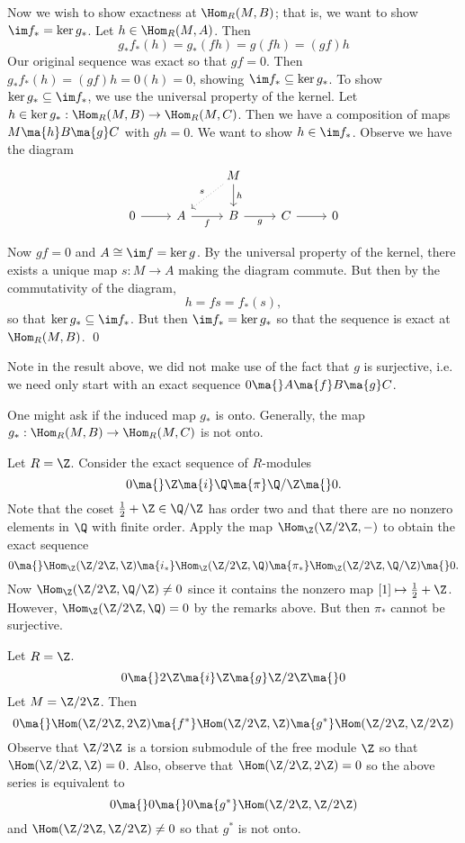 Now we wish to show exactness at $\Hom_R(M,B)$; that is, we want to show $\im f_*=\ker g_*$. Let $h \in \Hom_R(M,A)$. Then
	\[
	g_* f_*(h)=g_*(fh)=g (fh)=(gf) h
	\]
Our original sequence was exact so that $gf=0$. Then $g_*f_*(h)=(gf)h=0(h)=0$, showing $\im f_* \subseteq \ker g_*$. To show $\ker g_* \subseteq \im f_*$, we use the universal property of the kernel. Let $h \in \ker g_*: \Hom_R(M,B) \to \Hom_R(M,C)$. Then we have a composition of maps $M \ma{h} B \ma{g} C$ with $gh=0$. We want to show $h \in \im f_*$. Observe we have the diagram
	\[	
	\begin{tikzcd}
	\; & \;& M \arrow[swap,dotted]{dl}{s} \arrow{d}{h} & \; & \; \\
	0 \arrow{r} & A \arrow[swap]{r}{f} & B \arrow[swap]{r}{g} & C \arrow{r} & 0
	\end{tikzcd}
	\]

Now $gf=0$ and $A \cong \im f= \ker g$. By the universal property of the kernel, there exists a unique map $s: M \to A$ making the diagram commute. But then by the commutativity of the diagram,
	\[
	h=fs=f_*(s),
	\]
so that $\ker g_* \subseteq \im f_*$. But then $\im f_*=\ker g_*$ so that the sequence is exact at $\Hom_R(M,B)$. \qed \\


\begin{rem}
Note in the result above, we did not make use of the fact that $g$ is surjective, i.e. we need only start with an exact sequence $0 \ma{} A \ma{f} B \ma{g} C$.
\end{rem}


One might ask if the induced map $g_*$ is onto. Generally, the map $g_*: \Hom_R(M,B) \to \Hom_R(M,C)$ is not onto. 


\begin{ex}
Let $R=\Z$. Consider the exact sequence of $R$-modules
	\[
	0 \ma{} \Z \ma{i} \Q \ma{\pi} \Q/\Z \ma{} 0.
	\]
Note that the coset $\frac{1}{2}+\Z \in \Q/\Z$ has order two and that there are no nonzero elements in $\Q$ with finite order. Apply the map $\Hom_\Z(\Z/2\Z,-)$ to obtain the exact sequence
	\[
	0 \ma{} \Hom_\Z(\Z/2\Z,\Z) \ma{i_*} \Hom_\Z(\Z/2\Z,\Q) \ma{\pi_*} \Hom_\Z(\Z/2\Z,\Q/\Z) \ma{} 0.
	\]
Now $\Hom_\Z(\Z/2\Z,\Q/\Z) \neq 0$ since it contains the nonzero map $[1] \mapsto \frac{1}{2}+\Z$. However, $\Hom_\Z(\Z/2\Z,\Q)=0$ by the remarks above. But then $\pi_*$ cannot be surjective. \xqed
\end{ex}


\begin{ex}
Let $R=\Z$.
	\[
	0 \ma{} 2\Z \ma{i} \Z \ma{g} \Z/2\Z \ma{} 0
	\]
Let $M=\Z/2\Z$. Then
	\[
	0 \ma{} \Hom(\Z/2\Z,2\Z) \ma{f^*} \Hom(\Z/2\Z,\Z) \ma{g^*} \Hom(\Z/2\Z,\Z/2\Z)
	\]
Observe that $\Z/2\Z$ is a torsion submodule of the free module $\Z$ so that $\Hom(\Z/2\Z,\Z)=0$. Also, observe that $ \Hom(\Z/2\Z,2\Z)=0$ so the above series is equivalent to 
	\[
	0 \ma{} 0 \ma{} 0 \ma{g^*} \Hom(\Z/2\Z,\Z/2\Z)
	\]
and $\Hom(\Z/2\Z,\Z/2\Z) \neq 0$ so that $g^*$ is not onto. \xqed
\end{ex}



